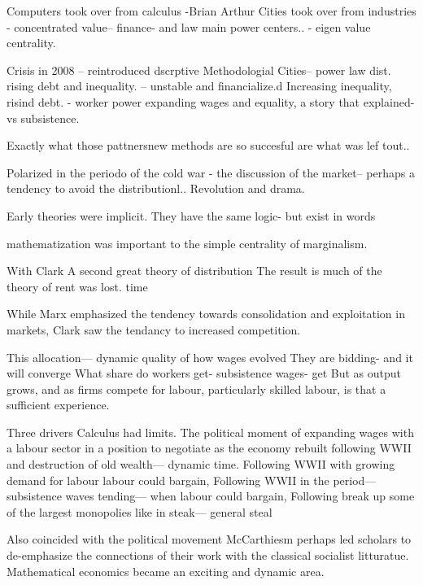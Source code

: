 Computers took over from calculus -Brian Arthur
Cities took over from industries - concentrated value-- finance- and law main power centers.. - eigen value centrality.

Crisis in 2008 -- reintroduced dscrptive
Methodologial
Cities-- power law dist. rising debt and inequality. -- unstable and financialize.d
Increasing inequality, risind debt. - worker power expanding wages and equality, a story that explained- vs subsistence.


Exactly what those pattnersnew methods are so succesful are what was lef tout..



Polarized in the periodo of the cold war - the discussion of the market-- perhaps a tendency to avoid the distributionl.. Revolution and drama.



Early theories were implicit. They have the same logic- but exist in words

mathematization was important to the simple centrality of marginalism.






With Clark
A second great theory of distribution
The result is much of the theory of rent was lost. 
time

While Marx emphasized the tendency towards consolidation and exploitation in markets, Clark saw the tendancy to increased competition. 

This allocation— dynamic quality of how wages evolved
They are bidding- and it will converge 
What share do workers get- subsistence wages- get 
But as output grows, and as firms compete for labour, particularly skilled labour, is that a sufficient experience.



Three drivers
Calculus had limits.
The political moment of expanding wages with a labour sector in a position to negotiate as the economy rebuilt following WWII and destruction of old wealth— dynamic time. 
Following WWII with growing demand for labour labour could bargain, 
Following WWII in the period— subsistence waves tending— when labour could bargain,
Following break up some of the largest monopolies like in steak— general steal


Also coincided with the political movement McCarthiesm perhaps led scholars to de-emphasize the connections of their work with the classical socialist litturatue.
Mathematical economics became an exciting and dynamic area.

